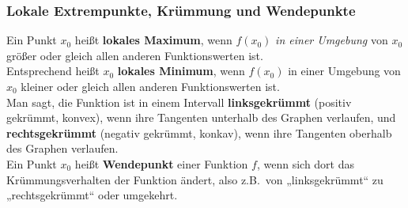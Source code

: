 \subsubsection*{Lokale Extrempunkte, Krümmung und Wendepunkte}
Ein Punkt $x_0$ hei{\ss}t \textbf{lokales Maximum}, wenn $f(x_0)$ \emph{in einer Umgebung} von $x_0$ gr\"o{\ss}er oder gleich allen anderen Funktionswerten ist. \\
Entsprechend hei{\ss}t $x_0$ \textbf{lokales Minimum}, wenn $f(x_0)$ in einer Umgebung von $x_0$ kleiner oder gleich allen anderen Funktionswerten ist. \vspace{5pt} \\
Man sagt, die Funktion ist in einem Intervall \textbf{linksgekrümmt} (positiv gekrümmt, konvex), wenn ihre Tangenten unterhalb des Graphen verlaufen, und \textbf{rechtsgekrümmt} (negativ gekrümmt, konkav), wenn ihre Tangenten oberhalb des Graphen verlaufen.\vspace{5pt} \\
Ein Punkt $x_0$ heißt \textbf{Wendepunkt} einer Funktion $f$, wenn sich dort das Krümmungsverhalten der Funktion ändert, also z.B.\ von „linksgekrümmt“ zu „rechtsgekrümmt“ oder umgekehrt.

\begin{center}  
\end{center}

